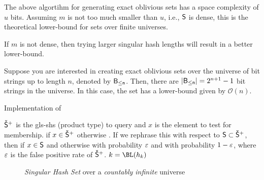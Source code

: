 \documentclass[ ../main.tex]{subfiles}
\begin{document}
The above algortihm for generating exact oblivious sets has a space complexity of $u$ bits. Assuming $m$ is not too much smaller than $u$, i.e., $\Set{S}$ is dense, this is the theoretical lower-bound for sets over finite universes.

If $m$ is not dense, then trying larger singular hash lengths will result in a better lower-bound.

Suppose you are interested in creating exact oblivious sets over the universe of bit strings up to length $n$, denoted by $\Set{B}[\leq n]$. Then, there are $\Card{\Set{B}[\leq n]} = 2^{n+1} - 1$ bit strings in the universe. In this case, the set has a lower-bound given by
$\mathcal{O}(n)$.

\begin{algorithm}
    \caption{Implementation of \protect\Contains}
    \label{alg:contains}
    \DontPrintSemicolon
    \KwIn
    {
        $\OPASet{S}$ is the \gls{gls-shs} (product type) to query and $x$ is 
        the element to test for membership.
    }
    \KwOut
    {
        \True if $x \in \OPASet{S}$ otherwise \False. If we rephrase this with 
        respect to $\Set{S} \subset \OPASet{S}$, then \True if $x \in \Set{S}$ 
        and otherwise \True with probability $\varepsilon$ and \False with 
        probability $1 - \varepsilon$, where $\varepsilon$ is the false positive rate 
        of $\OPASet{S}$.
    }
    {
        $k = \BL(h_k)$\;
        {
            \Return \True\;
        }
        \uElse
        {
            \Return \False\;
        }
    }
\end{algorithm}

\begin{figure}
    \centering
    
    \caption{\emph{Singular Hash Set} over a \emph{countably infinite} universe}
    \label{fig:my_label}
\end{figure}
\end{document}
